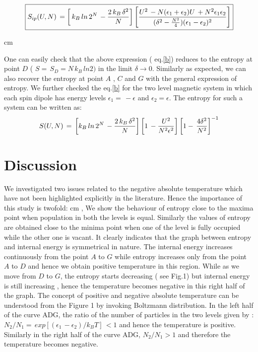 \documentclass{article}
\begin{document}
\begin{equation}
 \boxed{S_{ip}(U, N)\,=  \left[  \,k_B \, ln \,2^N\, - { 2\,k_B\, \delta^2 \over N} \right]\left[ U^2 \, - { N (\epsilon_1 + \epsilon_2) U \, + N^2 \epsilon_1 \epsilon_2 }\over { ( \delta^2 - { N^2 \over 4} ) (\epsilon_1 -\epsilon_2)^2 } \right]}
 \label{b}
\end{equation}

 cm


\noindent One can easily check that the above expression ( eq.{\ref{b}}) reduces to the entropy at point $D$ ( $S =\, S_D =  N\, k_B\, ln2)$ in the limit $\delta \rightarrow 0 $. Similarly as expected, we can also recover the entropy at point $A$ , $C$ and $G$ with the general expression of entropy.
We further checked the eq.{\ref{b}}  for the  two level magnetic system  in which each spin dipole has  energy levels $ \epsilon_1 = \, - \epsilon$ and $ \epsilon_2 = \epsilon$. The entropy for such a system can  be written as:
\begin{equation}
 S(U, N)\,=  \,\left[ k_B \, ln \,2^N\, - { 2\,k_B\, \delta^2 \over N} \right] \left[ {  1 \,-{ U^2 \over {N^2\epsilon^2}} } \right]
 \left [{ { 1 -\, {4\delta^2 \over N^2} }} \right]^{-1}
 \end{equation}

\section{Discussion}
We investigated two issues related to the negative absolute temperature which have not been highlighted explicitly in the literature. Hence
the importance of this study is twofold: 
 cm
, We show  the behaviour of entropy close to the maxima point when population in both the levels is equal. Similarly the values of entropy are obtained close to the minima point when one of the level is fully occupied while the other one is vacant.  It clearly indicates that the graph between entropy and internal energy is symmetrical in nature. The internal energy increases continuously from the point $A$ to $G$ while entropy increases only from the point $A$ to $D$  and hence we obtain positive temperature in this region. While as we move from $D$ to $G$, the entropy starts decreasing ( see Fig.1)  but internal energy is still increasing , hence the temperature becomes negative in this right half of the graph.  The concept of positive and  negative absolute temperature can be understood from the Figure 1 by invoking  Boltzmann distribution. In the left half of the curve ADG, the ratio of the  number of particles in  the two levels given by : $ N_2 /N_1 = \,exp [( \epsilon_1 \, -  \epsilon_2 )/ k_B T ]\, < 1$ and hence the temperature is positive. Similarly in the right half of the curve ADG, $N_2/N_1 >1$ and therefore the temperature becomes negative.
\end{document}
